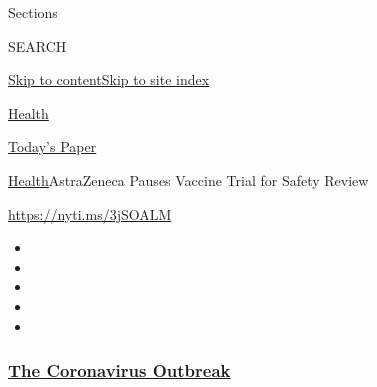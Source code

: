 Sections

SEARCH

\protect\hyperlink{site-content}{Skip to
content}\protect\hyperlink{site-index}{Skip to site index}

\href{https://www.nytimes3xbfgragh.onion/section/health}{Health}

\href{https://myaccount.nytimes3xbfgragh.onion/auth/login?response_type=cookie\&client_id=vi}{}

\href{https://www.nytimes3xbfgragh.onion/section/todayspaper}{Today's
Paper}

\href{/section/health}{Health}\textbar{}AstraZeneca Pauses Vaccine Trial
for Safety Review

\url{https://nyti.ms/3jSOALM}

\begin{itemize}
\item
\item
\item
\item
\item
\end{itemize}

\hypertarget{the-coronavirus-outbreak}{%
\subsubsection{\texorpdfstring{\href{https://www.nytimes3xbfgragh.onion/news-event/coronavirus?name=styln-coronavirus-national\&region=TOP_BANNER\&block=storyline_menu_recirc\&action=click\&pgtype=Article\&impression_id=11ea9900-f2ae-11ea-b55f-67263e649e17\&variant=undefined}{The
Coronavirus
Outbreak}}{The Coronavirus Outbreak}}\label{the-coronavirus-outbreak}}

